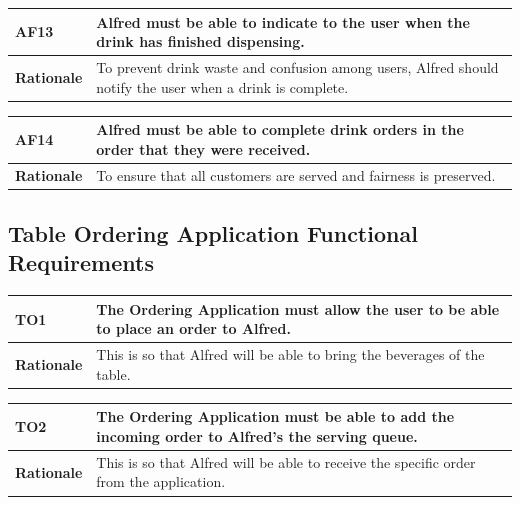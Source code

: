 \documentclass [11pt]{article}
\begin{document}
\begin{longtable}{| p{ } | p{ } | }\hline 
\rowcolor{tableCell}\textbf{AF13} & Alfred must be able to indicate to the user when the drink has finished dispensing. \\ \hline
\textbf{Rationale} &  To prevent drink waste and confusion among users, Alfred should notify the user when a drink is complete.\\ \hline 
\end{longtable}

\begin{longtable}{| p{ } | p{ } | }\hline 
\rowcolor{tableCell}\textbf{AF14} & Alfred must be able to complete drink orders in the order that they were received.\\ \hline
\textbf{Rationale} &  To ensure that all customers are served and fairness is preserved.\\ \hline 
\end{longtable}

\pagebreak

\subsection{Table Ordering Application Functional Requirements}

\begin{longtable}{| p{ } | p{ } | }\hline 
\rowcolor{tableCell}\textbf{TO1} & The Ordering Application must allow the user to be able to place an order to Alfred. \\ \hline
\textbf{Rationale} &  This is so that Alfred will be able to bring the beverages of the table.\\ \hline 
\end{longtable}

\begin{longtable}{| p{ } | p{ } | }\hline 
\rowcolor{tableCell}\textbf{TO2} & The Ordering Application must be able to add the incoming order to Alfred's  the serving queue. \\ \hline
\textbf{Rationale} &  This is so that Alfred will be able to receive the specific order from the application.\\ \hline 
\end{longtable}
\end{document}
